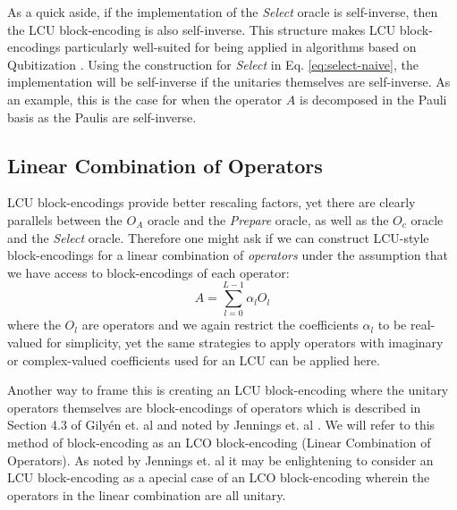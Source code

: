 As a quick aside, if the implementation of the \textit{Select} oracle is self-inverse, then the LCU block-encoding is also self-inverse.
This structure makes LCU block-encodings particularly well-suited for being applied in algorithms based on Qubitization \cite{low2019hamiltonian}.
Using the construction for \textit{Select} in Eq. \ref{eq:select-naive}, the implementation will be self-inverse if the unitaries themselves are self-inverse.
As an example, this is the case for when the operator $A$ is decomposed in the Pauli basis as the Paulis are self-inverse. 

\subsection{Linear Combination of Operators}
\label{subsec:unification}

LCU block-encodings provide better rescaling factors, yet there are clearly parallels between the $O_A$ oracle and the \textit{Prepare} oracle, as well as the $O_c$ oracle and the \textit{Select} oracle.
Therefore one might ask if we can construct LCU-style block-encodings for a linear combination of \textit{operators} under the assumption that we have access to block-encodings of each operator:
\begin{equation}
    \label{eq:lco}
    A = \sum_{l=0}^{L-1} \alpha_l O_l
\end{equation}
where the $O_l$ are operators and we again restrict the coefficients $\alpha_l$ to be real-valued for simplicity, yet the same strategies to apply operators with imaginary or complex-valued coefficients used for an LCU can be applied here.

Another way to frame this is creating an LCU block-encoding where the unitary operators themselves are block-encodings of operators which is described in Section 4.3 of Gilyén et. al \cite{gilyen2019quantum} and noted by Jennings et. al \cite{jennings2023efficient}.
We will refer to this method of block-encoding as an LCO block-encoding (Linear Combination of Operators).
As noted by Jennings et. al \cite{jennings2023efficient} it may be enlightening to consider an LCU block-encoding as a apecial case of an LCO block-encoding wherein the operators in the linear combination are all unitary.

